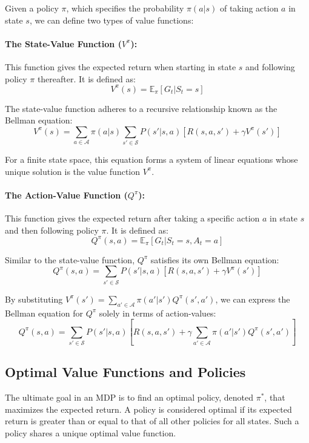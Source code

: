 Given a policy $\pi$, which specifies the probability $\pi(a|s)$ of taking action $a$ in state $s$, we can define two types of value functions:

\paragraph{The State-Value Function ($V^\pi$):}
This function gives the expected return when starting in state $s$ and following policy $\pi$ thereafter. It is defined as:
\begin{equation}
    V^\pi(s) = \mathbb{E}_\pi[G_t | S_t = s]
\end{equation}

The state-value function adheres to a recursive relationship known as the Bellman equation:
\begin{equation}
    V^\pi(s) = \sum_{a \in \mathcal{A}} \pi(a|s) \sum_{s' \in \mathcal{S}} P(s'|s,a)[R(s,a,s') + \gamma V^\pi(s')]
\end{equation}

For a finite state space, this equation forms a system of linear equations whose unique solution is the value function $V^\pi$.

\paragraph{The Action-Value Function ($Q^\pi$):}
This function gives the expected return after taking a specific action $a$ in state $s$ and then following policy $\pi$. It is defined as:
\begin{equation}
    Q^\pi(s,a) = \mathbb{E}_\pi[G_t | S_t = s, A_t = a]
\end{equation}

Similar to the state-value function, $Q^\pi$ satisfies its own Bellman equation:
\begin{equation}
    Q^\pi(s,a) = \sum_{s' \in \mathcal{S}} P(s'|s,a)[R(s,a,s') + \gamma V^\pi(s')]
\end{equation}

By substituting $V^\pi(s') = \sum_{a' \in \mathcal{A}} \pi(a'|s') Q^\pi(s',a')$, we can express the Bellman equation for $Q^\pi$ solely in terms of action-values:
\begin{equation}
    Q^\pi(s,a) = \sum_{s' \in \mathcal{S}} P(s'|s,a) \left[ R(s,a,s') + \gamma \sum_{a' \in \mathcal{A}} \pi(a'|s') Q^\pi(s',a') \right]
\end{equation}

\subsection*{Optimal Value Functions and Policies}
The ultimate goal in an MDP is to find an optimal policy, denoted $\pi^*$, that maximizes the expected return. A policy is considered optimal if its expected return is greater than or equal to that of all other policies for all states. Such a policy shares a unique optimal value function.

